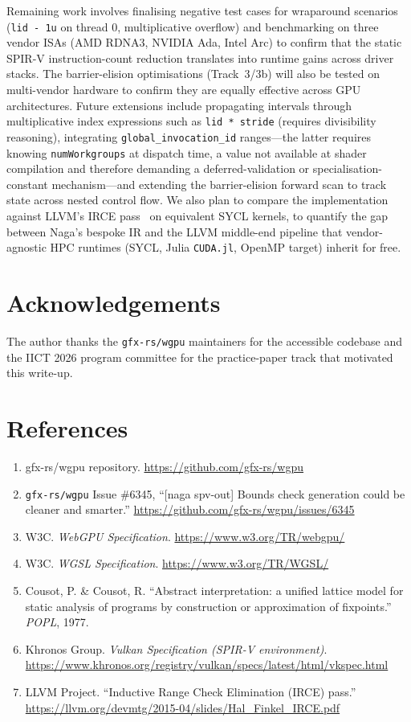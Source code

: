 \documentclass[10pt,a4paper,twocolumn]{article}
\begin{document}
Remaining work involves finalising negative test cases for wraparound scenarios
(\texttt{lid - 1u} on thread 0, multiplicative overflow) and benchmarking on
three vendor ISAs (AMD RDNA3, NVIDIA Ada, Intel Arc) to confirm that the static
SPIR-V instruction-count reduction translates into runtime gains across driver
stacks.  The barrier-elision optimisations (Track~3/3b) will also be tested on
multi-vendor hardware to confirm they are equally effective across GPU
architectures.  Future extensions include propagating intervals through
multiplicative index expressions such as \texttt{lid * stride} (requires
divisibility reasoning), integrating \texttt{global\_invocation\_id}
ranges---the latter requires knowing \texttt{numWorkgroups} at dispatch time, a
value not available at shader compilation and therefore demanding a
deferred-validation or specialisation-constant mechanism---and extending the
barrier-elision forward scan to track state across nested control flow.  We also
plan to compare the implementation against LLVM's IRCE pass~\cite{llvm-irce} on
equivalent SYCL kernels, to quantify the gap between Naga's bespoke IR and the
LLVM middle-end pipeline that vendor-agnostic HPC runtimes (SYCL, Julia
\texttt{CUDA.jl}, OpenMP target) inherit for free.

\section*{Acknowledgements}

The author thanks the \texttt{gfx-rs/wgpu} maintainers for the accessible
codebase and the IICT 2026 program committee for the practice-paper track that
motivated this write-up.

\footnotesize
\section*{References}
\begin{enumerate}[leftmargin=*, label={\arabic*.}]
\item gfx-rs/wgpu repository. \url{https://github.com/gfx-rs/wgpu}
\item \texttt{gfx-rs/wgpu} Issue \#6345, ``[naga spv-out] Bounds check generation could be cleaner and smarter.''
\url{https://github.com/gfx-rs/wgpu/issues/6345}\label{issue6345}
\item W3C. \emph{WebGPU Specification}. \url{https://www.w3.org/TR/webgpu/}\label{webgpu}
\item W3C. \emph{WGSL Specification}. \url{https://www.w3.org/TR/WGSL/}\label{wgsl}
\item Cousot, P. \& Cousot, R. ``Abstract interpretation: a unified lattice model for static analysis of programs by construction or approximation of fixpoints.'' \emph{POPL}, 1977.\label{cousot1977}
\item Khronos Group. \emph{Vulkan Specification (SPIR-V environment)}. \url{https://www.khronos.org/registry/vulkan/specs/latest/html/vkspec.html}
\item LLVM Project. ``Inductive Range Check Elimination (IRCE) pass.'' \url{https://llvm.org/devmtg/2015-04/slides/Hal_Finkel_IRCE.pdf}\label{llvm-irce}
\end{enumerate}
\end{document}
